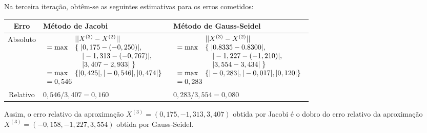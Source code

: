 \documentclass[12pt,a4paper]{article}
\begin{document}
\begin{ExerciseList}
\begin{center}
\begin{tabular}{cc}
\end{tabular}
\end{center}
\medskip
Na terceira iteração, obtêm-se as seguintes estimativas para os erros cometidos:
\medskip
\begin{center}
\begin{tabular}{|c|p{7.1cm}|p{7.1cm}|}
\hline
\textbf{Erro}
&
\textbf{Método de Jacobi}
&
\textbf{Método de Gauss-Seidel}\\\hline
Absoluto
&
$\begin{array}{lll}
       & ||X^{(3)} - X^{(2)}|| \\
= \max & \left\{\right. |0,175-(-0,250)|, \\
       & \quad |-1,313-(-0,767)|, \\
       & \quad |3,407 - 2,933| \left.\right\} \\
= \max & \left\{ |0,425|, |-0,546|, |0,474| \right\} \\
= 0,546\hspace{-1cm} &
\end{array}$
&
$\begin{array}{lll}
       & ||X^{(3)} - X^{(2)}|| \\
= \max & \left\{\right. |0.8335-0.8300|, \\
       & \quad |-1,227-(-1,210)|, \\
       & \quad |3,554-3,434| \left.\right\} \\
= \max & \left\{ |-0,283|, |-0,017|, |0,120| \right\} \\
= 0,283\hspace{-1cm} &
\end{array}$
\\\hline
Relativo
&
$0,546/3,407 = 0,160$
&
$0,283/3,554 = 0,080$
\\\hline
\end{tabular}
\end{center}

Assim, o erro relativo da aproximação $X^{(3)} = (0,175, -1,313, 3,407)$ obtida por Jacobi é o dobro do erro relativo da aproximação $X^{(3)} = (-0,158, -1,227, 3,554)$ obtida por Gauss-Seidel.


\end{ExerciseList}
\end{document}
